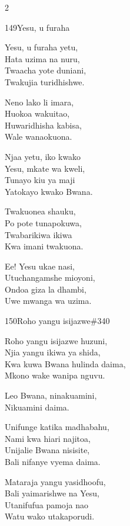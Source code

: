\documentclass{article}
\begin{document}
\begin{multicols}{2}
\begin{hymn}{149}{Yesu, u furaha}{}
\begin{stanza}
Yesu, u furaha yetu,\\
Hata uzima na nuru,\\
Twaacha yote duniani,\\
Twakujia turidhishwe.
\end{stanza}
\begin{stanza}
Neno lako li imara,\\
Huokoa wakuitao,\\
Huwaridhisha kabisa,\\
Wale wanaokuona.
\end{stanza}
\begin{stanza}
Njaa yetu, iko kwako\\
Yesu, mkate wa kweli,\\
Tunayo kiu ya maji\\
Yatokayo kwako Bwana.
\end{stanza}
\begin{stanza}
Twakuonea shauku,\\
Po pote tunapokuwa,\\
Twabarikiwa ikiwa\\
Kwa imani twakuona.
\end{stanza}
\begin{stanza}
Ee! Yesu ukae nasi,\\
Utuchangamshe mioyoni,\\
Ondoa giza la dhambi,\\
Uwe mwanga wa uzima.
\end{stanza}
\end{hymn}

\begin{hymn}{150}{Roho yangu isijazwe}{\#340}
\begin{stanza}
Roho yangu isijazwe huzuni,\\
Njia yangu ikiwa ya shida,\\
Kwa kuwa Bwana hulinda daima,\\
Mkono wake wanipa nguvu.
\end{stanza}
\begin{chorus}
Leo Bwana, ninakuamini,\\
Nikuamini daima.
\end{chorus}
\begin{stanza}
Unifunge katika madhabahu,\\
Nami kwa hiari najitoa,\\
Unijalie Bwana nisisite,\\
Bali nifanye vyema daima.
\end{stanza}
\begin{stanza}
Mataraja yangu yasidhoofu,\\
Bali yaimarishwe na Yesu,\\
Utanifufua pamoja nao\\
Watu wako utakaporudi.
\end{stanza}
\end{hymn}


\end{multicols}
\end{document}
